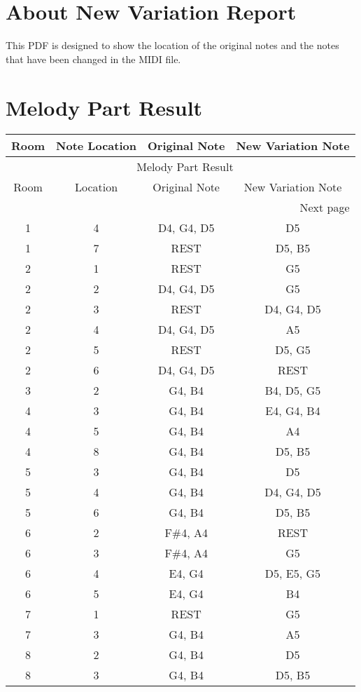 \documentclass{article}
\begin{document}
\section*{About New Variation Report}
This PDF is designed to show the location of the original notes and the notes that have been changed in the MIDI file.
\section*{Melody Part Result}\begin{longtable}{|c|c|c|c|}
\hline
Room & Note Location & Original Note & New Variation Note \\ \hline
\endfirsthead
\multicolumn{4}{c}{{\tablename\ \thetable{} Melody Part Result}} \\
\hline
Room & Location & Original Note & New Variation Note \\ \hline
\hline
\endhead
\hline
\multicolumn{4}{r}{Next page}\endfoot
\hline
\endlastfoot
1 & 3 & REST & D5 \\ 
1 & 4 & D4, G4, D5 & D5 \\ 
1 & 7 & REST & D5, B5 \\ 
\hline
2 & 1 & REST & G5 \\ 
2 & 2 & D4, G4, D5 & G5 \\ 
2 & 3 & REST & D4, G4, D5 \\ 
2 & 4 & D4, G4, D5 & A5 \\ 
2 & 5 & REST & D5, G5 \\ 
2 & 6 & D4, G4, D5 & REST \\ 
\hline
3 & 2 & G4, B4 & B4, D5, G5 \\ 
\hline
4 & 3 & G4, B4 & E4, G4, B4 \\ 
4 & 5 & G4, B4 & A4 \\ 
4 & 8 & G4, B4 & D5, B5 \\ 
\hline
5 & 3 & G4, B4 & D5 \\ 
5 & 4 & G4, B4 & D4, G4, D5 \\ 
5 & 6 & G4, B4 & D5, B5 \\ 
\hline
6 & 2 & F\#4, A4 & REST \\ 
6 & 3 & F\#4, A4 & G5 \\ 
6 & 4 & E4, G4 & D5, E5, G5 \\ 
6 & 5 & E4, G4 & B4 \\ 
\hline
7 & 1 & REST & G5 \\ 
7 & 3 & G4, B4 & A5 \\ 
\hline
8 & 2 & G4, B4 & D5 \\ 
8 & 3 & G4, B4 & D5, B5 \\ 

\end{longtable}
\end{document}
